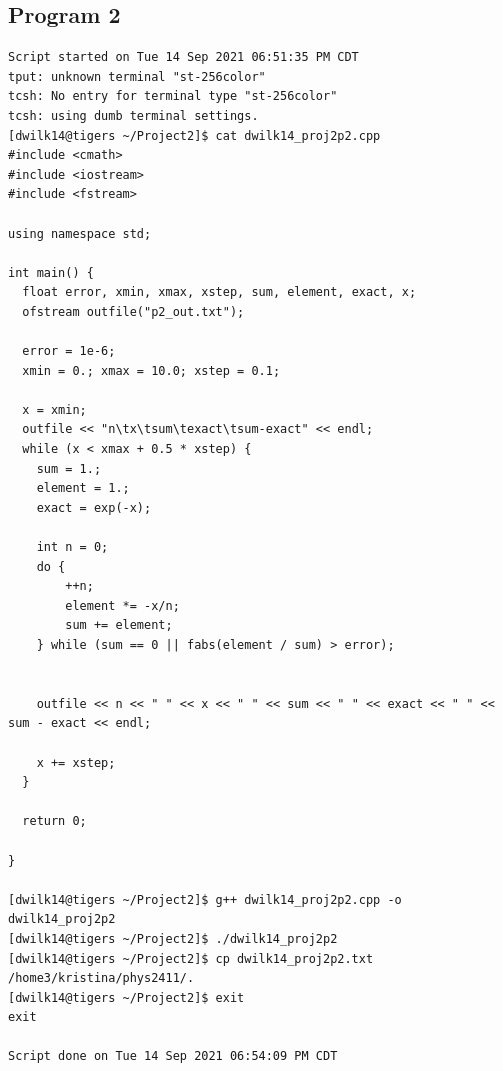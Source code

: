 \documentclass[11pt]{article}
\begin{document}
\subsection{Program 2}
\begin{verbatim}
Script started on Tue 14 Sep 2021 06:51:35 PM CDT
tput: unknown terminal "st-256color"
tcsh: No entry for terminal type "st-256color"
tcsh: using dumb terminal settings.
[dwilk14@tigers ~/Project2]$ cat dwilk14_proj2p2.cpp
#include <cmath>
#include <iostream>
#include <fstream>

using namespace std;

int main() {
  float error, xmin, xmax, xstep, sum, element, exact, x;
  ofstream outfile("p2_out.txt");

  error = 1e-6;
  xmin = 0.; xmax = 10.0; xstep = 0.1;

  x = xmin;
  outfile << "n\tx\tsum\texact\tsum-exact" << endl;
  while (x < xmax + 0.5 * xstep) {
    sum = 1.;
    element = 1.;
    exact = exp(-x);

    int n = 0;
    do {
        ++n;
        element *= -x/n;
        sum += element;
    } while (sum == 0 || fabs(element / sum) > error);


    outfile << n << " " << x << " " << sum << " " << exact << " " << sum - exact << endl;

    x += xstep;
  }

  return 0;

}

[dwilk14@tigers ~/Project2]$ g++ dwilk14_proj2p2.cpp -o dwilk14_proj2p2
[dwilk14@tigers ~/Project2]$ ./dwilk14_proj2p2
[dwilk14@tigers ~/Project2]$ cp dwilk14_proj2p2.txt /home3/kristina/phys2411/.
[dwilk14@tigers ~/Project2]$ exit
exit

Script done on Tue 14 Sep 2021 06:54:09 PM CDT

\end{verbatim}
\end{document}

